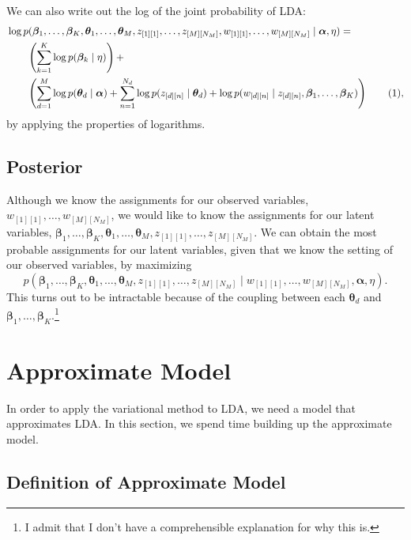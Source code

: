 \documentclass[12pt]{article}
\newcommand\numberthis{\addtocounter{equation}{1}\tag{\theequation}}
\begin{document}
We can also write out the log of the joint probability of LDA:
\begin{align*}
    &\log{p(\bm{\beta}_{1}, \ldots, \bm{\beta}_{K}, \bm{\theta}_{1}, \ldots,
    \bm{\theta}_{M}, z_{[1][1]}, \ldots, z_{[M][N_{M}]}, w_{[1][1]}, \ldots,
w_{[M][N_{M}]} \mid \bm{\alpha}, \eta)} = \\
    &\quad\quad\left(\sum_{k=1}^{K} \log{p(\bm{\beta}_{k} \mid
    \eta)}\right) + \\
    &\quad\quad\left(\sum_{d=1}^{M}\log{p(\bm{\theta}_{d} \mid
    \bm{\alpha})} + \sum_{n=1}^{N_{d}}\log{p(z_{[d][n]} \mid \bm{\theta}_{d}) +
    \log{p(w_{[d][n]} \mid z_{[d][n]}, \bm{\beta}_{1}, \ldots,
    \bm{\beta}_{K}})}\right)\numberthis\label{eq:logjointp},
\end{align*}
by applying the properties of logarithms.

\subsection{Posterior}

Although we know the assignments for our observed variables, $w_{[1][1]},
\ldots, w_{[M][N_{M}]}$, we would like to know the assignments for our latent
variables, $\bm{\beta}_{1}, \ldots, \bm{\beta}_{K}, \bm{\theta}_{1}, \ldots,
\bm{\theta}_{M}, z_{[1][1]}, \ldots, z_{[M][N_{M}]}$.  We can obtain the most
probable assignments for our latent variables, given that we know the setting of
our observed variables, by maximizing
\begin{equation}\label{eq:posterior}
    p(\bm{\beta}_{1}, \ldots, \bm{\beta}_{K}, \bm{\theta}_{1}, \ldots,
    \bm{\theta}_{M}, z_{[1][1]}, \ldots,
    z_{[M][N_{M}]} \mid w_{[1][1]}, \ldots, w_{[M][N_{M}]}, \bm{\alpha}, \eta).
\end{equation}
This turns out to be intractable because of the coupling between each
$\bm{\theta}_{d}$ and $\bm{\beta}_{1}, \ldots, \bm{\beta}_{K}$.\footnote{I admit
that I don't have a comprehensible explanation for why this is.}

\section{Approximate Model}

In order to apply the variational method to LDA, we need a model that
approximates LDA.  In this section, we spend time building up the approximate
model.

\subsection{Definition of Approximate Model}
\end{document}
